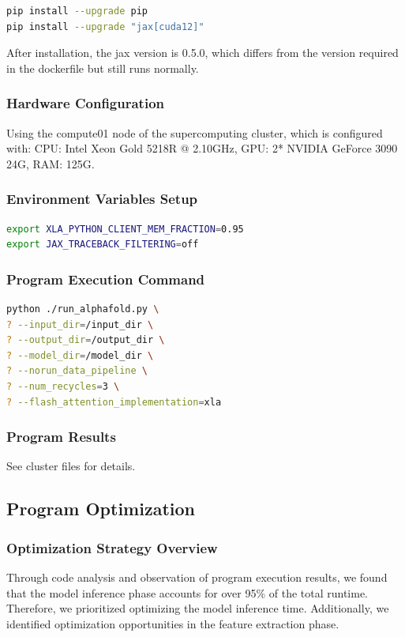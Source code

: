 \documentclass[a4paper,12pt]{article}
\begin{document}
\begin{lstlisting}[language=bash]
pip install --upgrade pip
pip install --upgrade "jax[cuda12]"
\end{lstlisting}

After installation, the jax version is 0.5.0, which differs from the version required in the dockerfile but still runs normally.

\subsubsection{Hardware Configuration}
Using the compute01 node of the supercomputing cluster, which is configured with: CPU: Intel Xeon Gold 5218R @ 2.10GHz, GPU: 2* NVIDIA GeForce 3090 24G, RAM: 125G.

\subsubsection{Environment Variables Setup}
\begin{lstlisting}[language=bash]
export XLA_PYTHON_CLIENT_MEM_FRACTION=0.95
export JAX_TRACEBACK_FILTERING=off
\end{lstlisting}

\subsubsection{Program Execution Command}
\begin{lstlisting}[language=bash]
python ./run_alphafold.py \
? --input_dir=/input_dir \
? --output_dir=/output_dir \
? --model_dir=/model_dir \
? --norun_data_pipeline \
? --num_recycles=3 \
? --flash_attention_implementation=xla
\end{lstlisting}

\subsubsection{Program Results}
See cluster files for details.

\subsection{Program Optimization}

\subsubsection{Optimization Strategy Overview}
Through code analysis and observation of program execution results, we found that the model inference phase accounts for over 95\% of the total runtime. Therefore, we prioritized optimizing the model inference time. Additionally, we identified optimization opportunities in the feature extraction phase.
\end{document}

